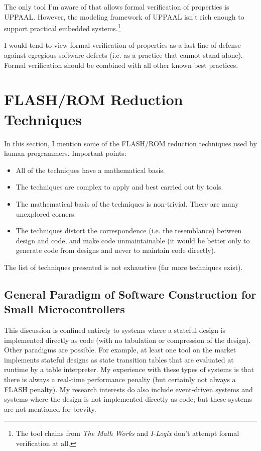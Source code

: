 \documentclass[letterpaper,10pt,titlepage]{article}
\begin{document}
The only tool I'm aware of that allows formal verification of properties
is UPPAAL.  However, the modeling framework of 
UPPAAL isn't rich enough to support practical embedded systems.\footnote{The
tool chains from \emph{The Math Works} and \emph{I-Logix} don't attempt
formal verification at all.}

I would tend to view formal verification of properties as a last line of defense
against egregious software defects (i.e. as a practice that cannot stand alone)\@.  
Formal verification should be combined with all other known
best practices.



\section{FLASH/ROM Reduction Techniques}
\label{sfrr0}

In this section, I mention some of the FLASH/ROM reduction techniques
used by human programmers.  Important points:

\begin{itemize}
\item All of the techniques have a mathematical basis.
\item The techniques are complex to apply and best carried out by tools.
\item The mathematical basis of the techniques is non-trivial.  There are
      many unexplored corners.
\item The techniques distort the correspondence (i.e. the resemblance)
      between design and code, and make code unmaintainable (it would be
      better only to generate code from designs and never to maintain
      code directly).
\end{itemize}

The list of techniques presented is not exhaustive (far more techniques
exist).


\subsection{General Paradigm of Software Construction for Small Microcontrollers}
\label{sfrr0:sgsc0}

This discussion is confined entirely to systems where a stateful design is
implemented directly as code (with no tabulation or compression of the design).
Other paradigms are possible.  For example, at least one tool on the market implements
stateful designs as state transition tables that are evaluated at runtime by
a table interpreter.  My experience with these types of systems is that there 
is always a real-time performance penalty (but certainly not always a
FLASH penalty).  My research interests do also include event-driven systems
and systems where the design is not implemented directly as code; but these
systems are not mentioned for brevity.
\end{document}

